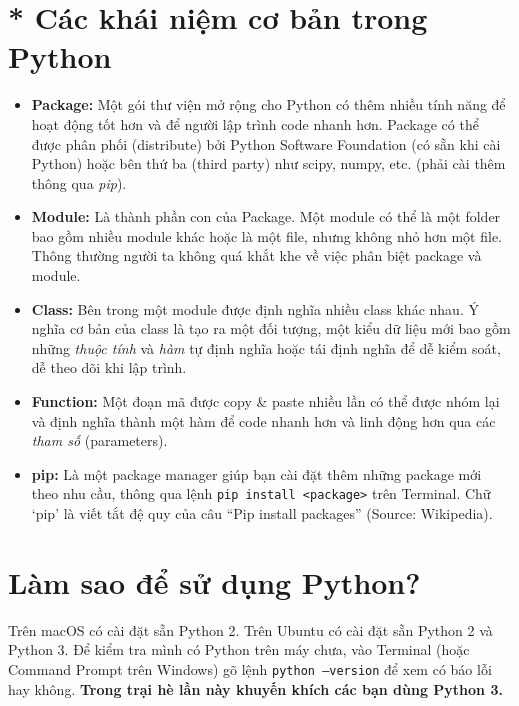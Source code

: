 \documentclass[12pt, a4paper, twoside]{article}
\begin{document}
\section{* Các khái niệm cơ bản trong Python}
\begin{itemize}
    \item \textbf{Package:} Một gói thư viện mở rộng cho Python có thêm nhiều tính năng để hoạt động tốt hơn và để người lập trình code nhanh hơn. Package có thể được phân phối (distribute) bởi Python Software Foundation (có sẵn khi cài Python) hoặc bên thứ ba (third party) như scipy, numpy, etc. (phải cài thêm thông qua \textit{pip}).
    \item \textbf{Module:} Là thành phần con của Package. Một module có thể là một folder bao gồm nhiều module khác hoặc là một file, nhưng không nhỏ hơn một file. Thông thường người ta không quá khắt khe về việc phân biệt package và module.
    \item \textbf{Class:} Bên trong một module được định nghĩa nhiều class khác nhau. Ý nghĩa cơ bản của class là tạo ra một đối tượng, một kiểu dữ liệu mới bao gồm những \textit{thuộc tính} và \textit{hàm} tự định nghĩa hoặc tái định nghĩa để dễ kiểm soát, dễ theo dõi khi lập trình.
    \item \textbf{Function:} Một đoạn mã được copy \& paste nhiều lần có thể được nhóm lại và định nghĩa thành một hàm để code nhanh hơn và linh động hơn qua các \textit{tham số} (parameters).
    \item \textbf{pip:} Là một package manager giúp bạn cài đặt thêm những package mới theo nhu cầu, thông qua lệnh \texttt{pip install <package>} trên Terminal. Chữ `pip' là viết tắt đệ quy của câu ``Pip install packages'' (Source: Wikipedia).
\end{itemize}
\section{Làm sao để sử dụng Python?}
Trên macOS có cài đặt sẵn Python 2. Trên Ubuntu có cài đặt sẵn Python 2 và Python 3. Để kiểm tra mình có Python trên máy chưa, vào Terminal (hoặc Command Prompt trên Windows) gõ lệnh \texttt{python --version} để xem có báo lỗi hay không. \textbf{Trong trại hè lần này khuyến khích các bạn dùng Python 3.}
\end{document}
